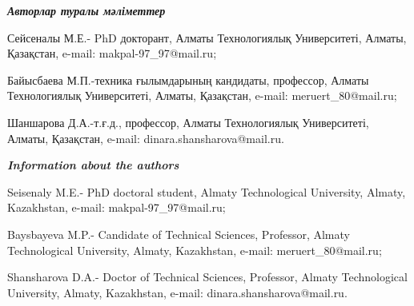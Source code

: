 \begin{info}
\hspace{1em}\emph{{\bfseries Авторлар туралы мәліметтер}}

Сейсеналы М.Е.- PhD докторант, Алматы Технологиялық Университеті,
Алматы, Қазақстан, e-mail: makpal-97\_97@mail.ru;

Байысбаева М.П.-техника ғылымдарының кандидаты, профессор, Алматы
Технологиялық Университеті, Алматы, Қазақстан, e-mail:
meruert\_80@mail.ru;

Шаншарова Д.А.-т.ғ.д., профессор, Алматы Технологиялық Университеті,
Алматы, Қазақстан, e-mail:
dinara.shansharova@mail.ru.

\hspace{1em}\emph{{\bfseries Information about the authors}}

Seisenaly M.E.- PhD doctoral student, Almaty Technological
University, Almaty, Kazakhstan, e-mail: makpal-97\_97@mail.ru;

Baysbayeva M.P.- Candidate of Technical Sciences, Professor, Almaty
Technological University, Almaty, Kazakhstan, e-mail:
meruert\_80@mail.ru;

Shansharova D.A.- Doctor of Technical Sciences, Professor, Almaty
Technological University, Almaty, Kazakhstan, e-mail:
dinara.shansharova@mail.ru.
\end{info}
